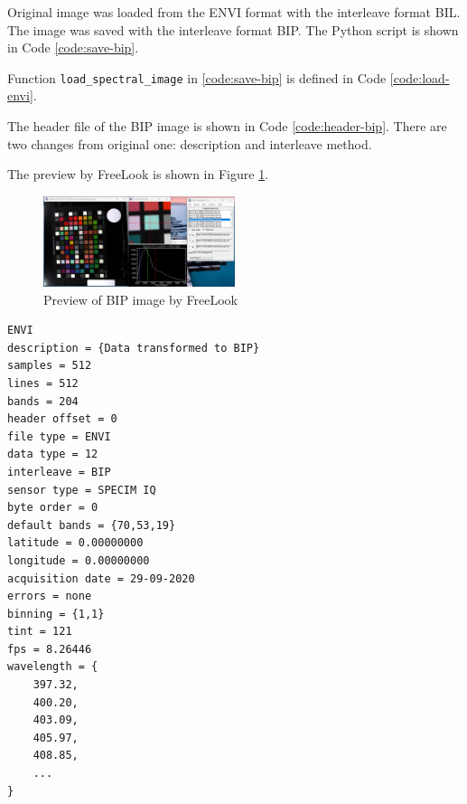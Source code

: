 Original image was loaded from the ENVI format with the interleave
format BIL. The image was saved with the interleave format BIP. The
Python script is shown in Code \ref{code:save-bip}.

Function \texttt{load\_spectral\_image} in \ref{code:save-bip} is
defined in Code \ref{code:load-envi}.

The header file of the BIP image is shown in Code
\ref{code:header-bip}. There are two changes from original one:
description and interleave method.

The preview by FreeLook is shown in Figure \ref{fig:bip-preview}.

\begin{figure}[H]
  \centering
  \caption{Preview of BIP image by FreeLook}
  \label{fig:bip-preview}
  \includegraphics[width=0.5\textwidth]{./fig-task4/bip_preview.png}
\end{figure}

\begin{lstlisting}[caption=Header file of BIP, label={code:header-bip}]
ENVI
description = {Data transformed to BIP}
samples = 512
lines = 512
bands = 204
header offset = 0
file type = ENVI
data type = 12
interleave = BIP
sensor type = SPECIM IQ
byte order = 0
default bands = {70,53,19}
latitude = 0.00000000
longitude = 0.00000000
acquisition date = 29-09-2020
errors = none
binning = {1,1}
tint = 121
fps = 8.26446
wavelength = {
    397.32,
    400.20,
    403.09,
    405.97,
    408.85,
    ...
}
\end{lstlisting}
